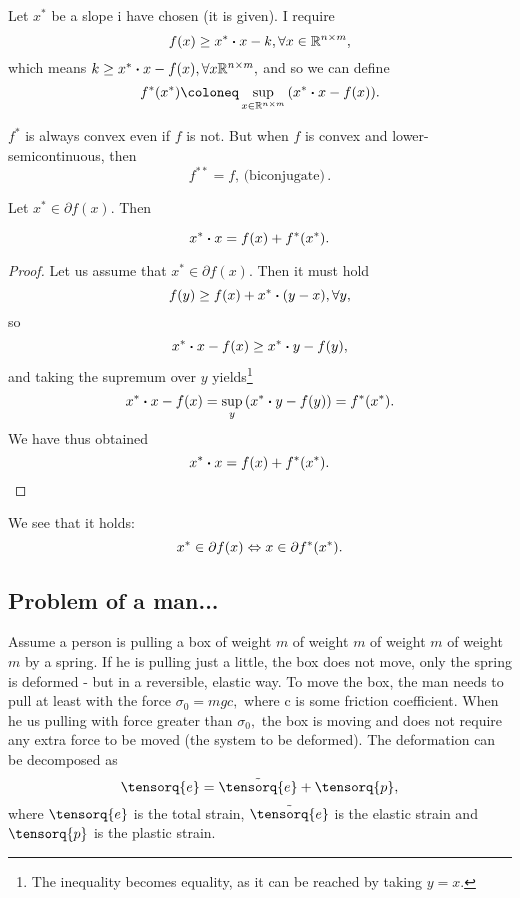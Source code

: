 \documentclass[reqno, a4paper]{article}
\begin{document}
\begin{definition}
Let $x^{*}$ be a slope i have chosen (it is given). I require
\[
	f(x) \geq x^{*} \vdot x - k, \forall x \in \R^{n \times m},
\]
which means $k \geq x^{*} \vdot x - f(x), \forall x\R^{n \times m},$ and so we can define
\[
	f^{*}\qty(x^{*}) \coloneq \sup_{x \in \R^{n \times m}}\qty(x^{*} \vdot x - f(x)).
\]
\end{definition}

\begin{remark}
	$f^{*}$ is always convex even if $f$ is not. But when $f$ is convex and lower-semicontinuous, then
	\[
		f^{**} = f, \, \text{(biconjugate)} \,.
	\]
\end{remark}

\begin{theorem}
Let $x^{*} \in \partial f(x).$ Then

\[
	x^{*} \vdot x = f(x) + f^{*}(x^{*}).
\]
\begin{proof}
Let us assume that $x^{*} \in \partial f(x)$. Then it must hold
\[
	f(y) \geq f(x) + x^{*} \vdot \qty(y-x), \forall y,
\]
so
\[
	x^{*} \vdot x - f(x) \geq x^{*} \vdot y - f\qty(y),
\]
and taking the supremum over $y$ yields\footnote{The inequality becomes equality, as it can be reached by taking $y=x$.}
\[
	x^{*} \vdot x -f (x) = \sup_y \qty(x^{*} \vdot y - f(y)) = f^{*}\qty(x^{*}).
\]
We have thus obtained
\[
	x^{*} \vdot x = f(x) + f^{*}(x^{*}).
\]

\end{proof}
\end{theorem}

\begin{remark}
	We see that it holds:
	\[
		x^{*} \in \partial f(x) \Leftrightarrow x \in \partial f^{*}\qty(x^{*}).
	\]
\end{remark}

\subsection{Problem of a man...}
\label{sec:problem}

Assume a person is pulling a box of weight $m$ of weight $m$ of weight $m$ of weight $m$ by a spring. If he is pulling just a little, the box does not move, only the spring is deformed - but in a reversible, elastic way.
To move the box, the man needs to pull at least with the force $\sigma_0 = mgc,$ where c is some friction coefficient. When he us pulling with force greater than $\sigma_0,$ the box is moving and does not require any extra force to be moved (the system to be deformed). The deformation can be decomposed as
\[
	\tensorq{e} = \tilde{\tensorq{e}} + \tensorq{p},
\]
where $\tensorq{e}$ is the total strain, $\tilde{\tensorq{e}}$ is the elastic strain and $\tensorq{p}$ is the plastic strain.
\end{document}
